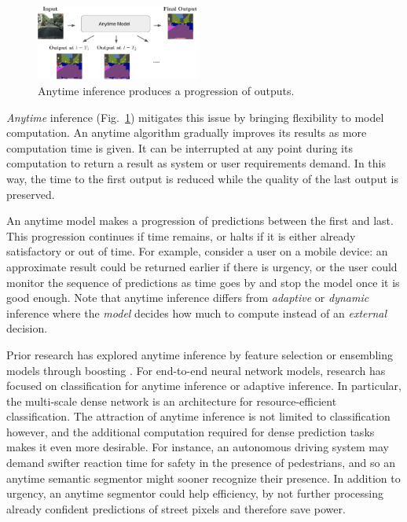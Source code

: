 \documentclass{article} %
\begin{document}
\begin{figure}
   \begin{center}
    \vspace{-15pt}
    \includegraphics[width=0.48\textwidth]{teaser-crop.pdf}

   \end{center}
    \vspace{-10pt}

    \caption{%
    Anytime inference produces a progression of outputs.
    }
    \label{fig:teaser}
    \vspace{-12pt}
\end{figure}

\emph{Anytime} inference (Fig.~\ref{fig:teaser}) mitigates this issue by bringing flexibility to model computation.
An anytime algorithm \citep{dean1988analysis} gradually improves its results as more computation time is given.
It can be interrupted at any point during its computation to return a result as system or user requirements demand.
In this way, the time to the first output is reduced while the quality of the last output is preserved.

An anytime model makes a progression of predictions between the first and last.
This progression continues if time remains, or halts if it is either already satisfactory or out of time.
For example, consider a user on a mobile device: an approximate result could be returned earlier if there is urgency, or the user could monitor the sequence of predictions as time goes by and stop the model once it is good enough.
Note that anytime inference differs from \emph{adaptive} or \emph{dynamic} inference \citep{veit2018convolutional,Wu2018BlockDropDI,wang2018skipnet} where the \emph{model} decides how much to compute instead of an \emph{external} decision. 


Prior research has explored anytime inference by feature selection \citep{karayev2014anytime} or ensembling models through boosting \citep{grubb2012speedboost}.
For end-to-end neural network models, research has focused on classification for anytime inference or adaptive inference.
In particular, the multi-scale dense network \citep{huang2017multi} is an architecture for resource-efficient classification.
The attraction of anytime inference is not limited to classification however, and the additional computation required for dense prediction tasks makes it even more desirable.
For instance, an autonomous driving system may demand swifter reaction time for safety in the presence of pedestrians, and so an anytime semantic segmentor might sooner recognize their presence.
In addition to urgency, an anytime segmentor could help efficiency, by not further processing already confident predictions of street pixels and therefore save power.
\end{document}
